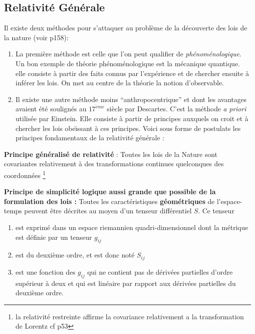 \documentclass[12pt]{book}
\begin{document}
\subsection{Relativit\'e G\'en\'erale}
Il existe deux m\'ethodes pour s'attaquer au probl\`eme de la d\'ecouverte
des lois de la nature (voir \cite{ph:relat:Charon63} p158):
\begin{enumerate}
\item La premi\`ere m\'ethode est celle que l'on peut qualifier de {\it
ph\'enom\'enologique}. Un bon exemple de th\'eorie
ph\'enom\'enologique est la 
m\'ecanique quantique. elle consiste \`a partir des faits connus par
l'exp\'erience et de chercher ensuite \`a inf\'erer les lois. On met au
centre de la th\'eorie la notion d'observable.
\item Il existe une autre m\'ethode moins ``anthropocentrique'' et dont
les avantages avaient \'et\'e soulign\'es au $17^{\grave eme}$ si\`ecle
par Descartes. 
C'est la m\'ethode {\it a priori} utilis\'ee par Einstein. Elle
consiste \`a partir de principes auxquels on croit et \`a chercher les
lois obe\"\i ssant \`a ces principes.
Voici sous forme de postulats les principes fondamentaux de la
relativit\'e g\'en\'erale :
\end{enumerate}
\begin{postulat}
{\bf Principe g\'en\'eralis\'e de relativit\'e}\cite{ph:relat:Charon63} :
Toutes les lois de la Nature sont covariantes relativement \`a des
transformations continues quelconques des coordonn\'ees
\footnote{la relativit\'e restreinte affirme la covariance relativement
a la transformation de Lorentz cf \cite{ph:relat:Boudenot89} p53}
\end{postulat}
\begin{postulat}
{\bf Principe de simplicit\'e logique aussi grande que possible de la
formulation des lois :}
Toutes les caract\'eristiques {\bf g\'eom\'etriques} de
l'espace-temps  peuvent \^etre d\'ecrites au moyen d'un tenseur
diff\'erentiel $S$. Ce tenseur  
\begin{enumerate}
\item est exprim\'e dans un espace riemannien quadri-dimensionnel dont la
m\'etrique est d\'efinie par un tenseur $g_{ij}$
\item est du deuxi\`eme ordre, et est donc not\'e $S_{ij}$
\item est une fonction des $g_{ij}$ qui ne contient pas de
d\'eriv\'ees partielles d'ordre sup\'erieur \`a deux et qui est 
lin\'eaire par rapport aux d\'eriv\'ees partielles du deuxi\`eme ordre.
\end{enumerate}
\end{postulat}
\end{document}
